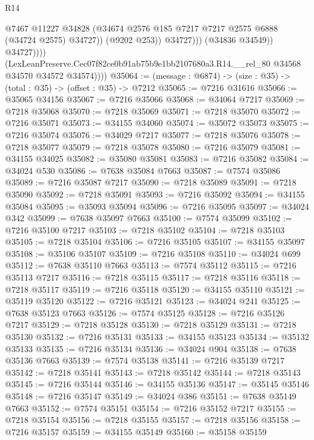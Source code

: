 \begin{lexlean}{R14}
\begin{coremodule}
                              @7467
                              @11227
                              @34828
                              (@34674 @2576 @185 @7217 @7217 @2575 @6888 (@34724 @2575) @34727))
                            (@9202 @253))
                          @34727)))
                    (@34836 @34549))
                  @34727))))
          (LexLeanPreserve.Cec07f82ce0b91ab75b9e1bb2107680a3.R14.__rel_80
            @34568
            @34570
            @34572
            @34574))))
@35064 := (message : @6874) -> (size : @35) -> (total : @35) -> (offset : @35) -> @7212
@35065 := @7216 @31616
@35066 := @35065 @34156
@35067 := @7216 @35066
@35068 := @34064 @7217
@35069 := @7218 @35068
@35070 := @7218 @35069
@35071 := @7218 @35070
@35072 := @7216 @35071
@35073 := @34155 @34060
@35074 := @35072 @35073
@35075 := @7216 @35074
@35076 := @34029 @7217
@35077 := @7218 @35076
@35078 := @7218 @35077
@35079 := @7218 @35078
@35080 := @7216 @35079
@35081 := @34155 @34025
@35082 := @35080 @35081
@35083 := @7216 @35082
@35084 := @34024 @530
@35086 := @7638 @35084 @7663
@35087 := @7574 @35086
@35089 := @7216 @35087 @7217
@35090 := @7218 @35089
@35091 := @7218 @35090
@35092 := @7218 @35091
@35093 := @7216 @35092
@35094 := @34155 @35084
@35095 := @35093 @35094
@35096 := @7216 @35095
@35097 := @34024 @342
@35099 := @7638 @35097 @7663
@35100 := @7574 @35099
@35102 := @7216 @35100 @7217
@35103 := @7218 @35102
@35104 := @7218 @35103
@35105 := @7218 @35104
@35106 := @7216 @35105
@35107 := @34155 @35097
@35108 := @35106 @35107
@35109 := @7216 @35108
@35110 := @34024 @699
@35112 := @7638 @35110 @7663
@35113 := @7574 @35112
@35115 := @7216 @35113 @7217
@35116 := @7218 @35115
@35117 := @7218 @35116
@35118 := @7218 @35117
@35119 := @7216 @35118
@35120 := @34155 @35110
@35121 := @35119 @35120
@35122 := @7216 @35121
@35123 := @34024 @241
@35125 := @7638 @35123 @7663
@35126 := @7574 @35125
@35128 := @7216 @35126 @7217
@35129 := @7218 @35128
@35130 := @7218 @35129
@35131 := @7218 @35130
@35132 := @7216 @35131
@35133 := @34155 @35123
@35134 := @35132 @35133
@35135 := @7216 @35134
@35136 := @34024 @904
@35138 := @7638 @35136 @7663
@35139 := @7574 @35138
@35141 := @7216 @35139 @7217
@35142 := @7218 @35141
@35143 := @7218 @35142
@35144 := @7218 @35143
@35145 := @7216 @35144
@35146 := @34155 @35136
@35147 := @35145 @35146
@35148 := @7216 @35147
@35149 := @34024 @386
@35151 := @7638 @35149 @7663
@35152 := @7574 @35151
@35154 := @7216 @35152 @7217
@35155 := @7218 @35154
@35156 := @7218 @35155
@35157 := @7218 @35156
@35158 := @7216 @35157
@35159 := @34155 @35149
@35160 := @35158 @35159

\end{coremodule}
\end{lexlean}
